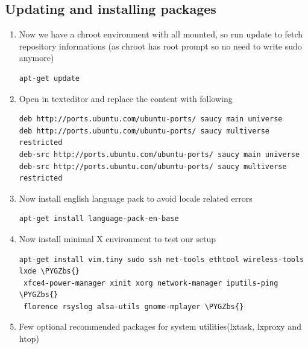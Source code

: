 \documentclass[letterpaper,10pt,english]{sphinxmanual}
\def\PYGZbs{\char`\\}
\begin{document}
\subsection{Updating and installing packages}
\label{embedded-linux:updating-and-installing-packages}\begin{enumerate}
\item {} 
Now we have a chroot environment with all  mounted,
so run update to fetch repository informations (as chroot has root prompt so
no need to write sudo anymore)

\begin{Verbatim}[commandchars=\\\{\}]
apt-get update
\end{Verbatim}

\item {} 
Open  in texteditor and replace the content with following

\begin{Verbatim}[commandchars=\\\{\}]
deb http://ports.ubuntu.com/ubuntu-ports/ saucy main universe
deb http://ports.ubuntu.com/ubuntu-ports/ saucy multiverse restricted
deb-src http://ports.ubuntu.com/ubuntu-ports/ saucy main universe
deb-src http://ports.ubuntu.com/ubuntu-ports/ saucy multiverse restricted
\end{Verbatim}

\item {} 
Now install english language pack to avoid locale related errors

\begin{Verbatim}[commandchars=\\\{\}]
apt-get install language-pack-en-base
\end{Verbatim}

\item {} 
Now install minimal X environment to test our setup

\begin{Verbatim}[commandchars=\\\{\}]
apt-get install vim.tiny sudo ssh net-tools ethtool wireless-tools lxde \PYGZbs{}
 xfce4-power-manager xinit xorg network-manager iputils-ping \PYGZbs{}
 florence rsyslog alsa-utils gnome-mplayer \PYGZbs{}
\end{Verbatim}

\item {} 
Few optional recommended packages for system utilities(lxtask, lxproxy and htop)


\end{enumerate}
\end{document}
